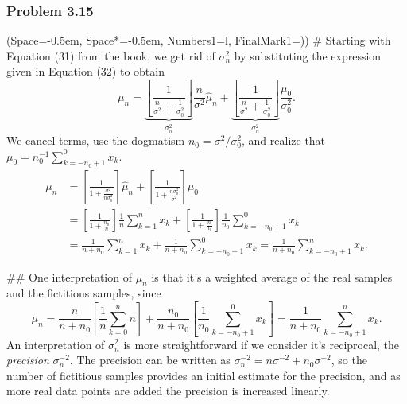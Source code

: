 \documentclass[12pt, a4paper]{article}
\newcommand{\listSpace}{-0.5em}%
\begin{document}
\subsubsection*{Problem 3.15}
\begin{easylist}[enumerate]
\ListProperties(Space=\listSpace, Space*=\listSpace, Numbers1=l, FinalMark1={)})
# Starting with Equation (31) from the book, we get rid of $\sigma_n^2$ by substituting the expression given in Equation (32) to obtain
\begin{equation*}
\mu_n =
\underbrace{ \left[ \frac{1}{\frac{n}{\sigma^2} + \frac{1}{\sigma_0^2}} \right]}_{\sigma^2_n}
\frac{n}{\sigma^2} \hat{\mu}_n + 
\underbrace{ \left[ \frac{1}{\frac{n}{\sigma^2} + \frac{1}{\sigma_0^2}} \right]}_{\sigma^2_n}
\frac{\mu_0}{\sigma_0^2}.
\end{equation*}
We cancel terms, use the dogmatism $n_0 = \sigma^2 / \sigma_0^2$, and realize that $\mu_0 = n_0^{-1} \sum_{k = -n_0 + 1}^{0} x_k$.
\begin{align*}
\mu_n &= \left[ \frac{1}{1 + \frac{\sigma^2}{n \sigma_0^2}}  \right]
\hat{\mu}_n + 
\left[ \frac{1}{1 + \frac{n \sigma_0^2}{\sigma^2}} \right] \mu_0 \\
&= \left[ \frac{1}{1 + \frac{n_0}{n}}  \right]
\frac{1}{n} \sum_{k = 1}^{n} x_k
+ 
\left[ \frac{1}{1 + \frac{n}{n_0}} \right]
 \frac{1}{n_0} \sum_{k = -n_0 + 1}^{0} x_k
 \\
 &= \frac{1}{n + n_0} \sum_{k = 1}^{n} x_k + 
 \frac{1}{n + n_0} \sum_{k = -n_0 + 1}^{0} x_k = 
 \frac{1}{n + n_0} \sum_{k = -n_0 + 1}^{n} x_k.
\end{align*}

## One interpretation of $\mu_n$ is that it's a weighted average of the real samples and the fictitious samples, since
\begin{equation*}
	\mu_n = 
	\frac{n}{n + n_0} \left[ \frac{1}{n} \sum_{k = 0}^{n} n \right] 
	+
	\frac{n_0}{n + n_0} \left[ \frac{1}{n_0} \sum_{k = -n_0 + 1}^{0} x_k \right] = 
	\frac{1}{n + n_0} \sum_{k = -n_0 + 1}^{n} x_k.
\end{equation*}
An interpretation of $\sigma_n^2$ is more straightforward if we consider it's reciprocal, the \emph{precision} $\sigma_n^{-2}$.
The precision can be written as $\sigma_n^{-2} = n \sigma^{-2} + n_0 \sigma^{-2}$, so the number of fictitious samples provides an initial estimate for the precision, and as more real data points are added the precision is increased linearly.
	
\end{easylist}
\end{document}
